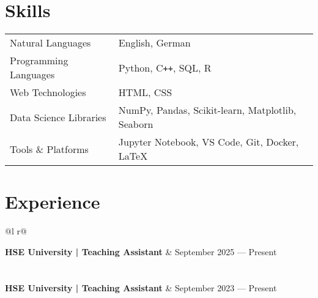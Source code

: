 \documentclass[a4paper,10pt]{article}
\begin{document}
\section{Skills}
\setlength{\tabcolsep}{0.5cm}
\begin{tabularx}{\linewidth}{@{}l X@{}}

Natural Languages & English, German \\ [1.75pt]
Programming Languages & Python, C\texttt{++}, SQL, R \\ [1.75pt]
Web Technologies & HTML, CSS \\ [1.75pt]
Data Science Libraries & NumPy, Pandas, Scikit-learn, Matplotlib, Seaborn \\ [1.75pt]
Tools \& Platforms & Jupyter Notebook, VS Code, Git, Docker, \LaTeX
\end{tabularx}



\section{Experience}

\begin{tabularx}{\linewidth}{ @{}l r@{} }

\textbf{HSE University | Teaching Assistant} & September 2025 –– Present \\ [1.75pt]
  \\ \\

\textbf{HSE University | Teaching Assistant} &  September 2023 –– Present \\ [1.75pt]
  \\
\end{tabularx}
\end{document}

